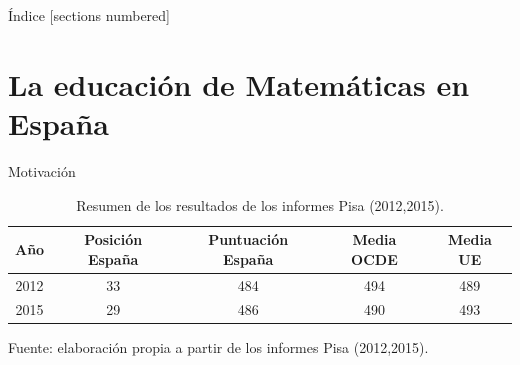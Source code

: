 \documentclass[10pt,notes,compress,usetitleprogressbar,aspectratio=1610]{beamer}
\title{\titulo}
\subtitle{\TFM}
\author{Víctor de Juan Sanz}
\date{Julio 2017}
\institute{}
\begin{document}
\maketitle

\begin{frame}{Índice}
	[sections numbered]
	\tableofcontents[hideallsubsections]
\end{frame}


\section{La educación de Matemáticas en España}
\note{}


\begin{frame}{Motivación}
	\note{}
		\begin{table}[hbtp]
		\centering
		\caption{Resumen de los resultados de los informes Pisa (2012,2015).}
		\label{tbl::ResumenPisa}
		\begin{tabular}{c|cccc}
		Año & Posición España & Puntuación España & Media OCDE & Media UE\\\hline
		2012 & 33 & 484 & 494 & 489\\
		2015 & 29 & 486 & 490 & 493
		\end{tabular}
		\vspace{0.3cm}

		\small{Fuente: elaboración propia a partir de los informes Pisa (2012,2015).}
		\end{table}

\end{frame}
\end{document}
